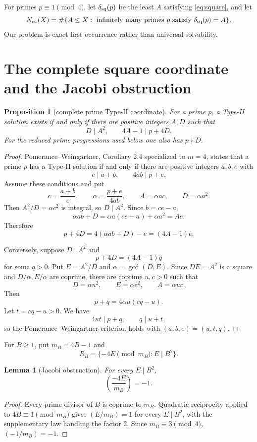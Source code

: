 \documentclass[11pt]{article}
\newtheorem{lemma}[theorem]{Lemma}
\newtheorem{proposition}[theorem]{Proposition}
\theoremstyle{definition}
\newcommand{\sqdepth}{\delta_{\rm sq}}
\begin{document}
For primes $p\equiv1\pmod4$, let $\sqdepth(p)$ be the least $A$ satisfying \eqref{eq:square}, and let
\[
N_\infty(X)=\#\{A\le X:\text{ infinitely many primes }p\text{ satisfy }\sqdepth(p)=A\}.
\]
Our problem is exact first occurrence rather than universal solvability.

\section{The complete square coordinate and the Jacobi obstruction}
\begin{proposition}[complete prime Type-II coordinate]\label{prop:complete}
For a prime $p$, a Type-II solution exists if and only if there are positive integers $A,D$ such that
\[
D\mid A^2,\qquad 4A-1\mid p+4D.
\]
For the reduced prime progressions used below one also has $p\nmid D$.
\end{proposition}

\begin{proof}
Pomerance--Weingartner, Corollary 2.4 specialized to $m=4$, states that a prime $p$ has a Type-II solution if and only if there are positive integers $a,b,e$ with
\[
e\mid a+b,\qquad 4ab\mid p+e.
\]
Assume these conditions and put
\[
c=\frac{a+b}{e},\qquad \alpha=\frac{p+e}{4ab},\qquad A=\alpha ac,\qquad D=\alpha a^2.
\]
Then $A^2/D=\alpha c^2$ is integral, so $D\mid A^2$. Since $b=ce-a$,
\[
\alpha ab+D=\alpha a(ce-a)+\alpha a^2=Ae.
\]
Therefore
\[
p+4D=4(\alpha ab+D)-e=(4A-1)e.
\]

Conversely, suppose $D\mid A^2$ and
\[
p+4D=(4A-1)q
\]
for some $q>0$. Put $E=A^2/D$ and $\alpha=\gcd(D,E)$. Since $DE=A^2$ is a square and $D/\alpha,E/\alpha$ are coprime, there are coprime $u,c>0$ such that
\[
D=\alpha u^2,\qquad E=\alpha c^2,\qquad A=\alpha uc.
\]
Then
\[
p+q=4\alpha u(cq-u).
\]
Let $t=cq-u>0$. We have
\[
4ut\mid p+q,\qquad q\mid u+t,
\]
so the Pomerance--Weingartner criterion holds with $(a,b,e)=(u,t,q)$.
\end{proof}

For $B\ge1$, put $m_B=4B-1$ and
\[
R_B=\{-4E\pmod{m_B}:E\mid B^2\}.
\]

\begin{lemma}[Jacobi obstruction]\label{lem:jacobi}
For every $E\mid B^2$,
\[
\boxed{\left(\frac{-4E}{m_B}\right)=-1.}
\]
\end{lemma}

\begin{proof}
Every prime divisor of $B$ is coprime to $m_B$. Quadratic reciprocity applied to $4B\equiv1\pmod{m_B}$ gives $(E/m_B)=1$ for every $E\mid B^2$, with the supplementary law handling the factor $2$. Since $m_B\equiv3\pmod4$, $(-1/m_B)=-1$.
\end{proof}
\end{document}
